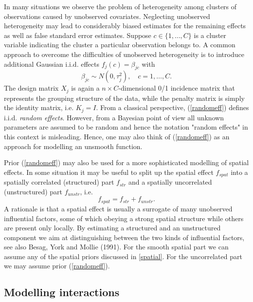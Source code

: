 \documentclass[11pt,a4paper,twoside]{bayesxarticle}
\begin{document}
In many situations we observe the problem of heterogeneity among
clusters of observations caused by unobserved covariates. Neglecting
unobserved heterogeneity may lead to considerably biased estimates
for the remaining effects as well as false standard error estimates.
Suppose $c \in \{1,\dots,C\}$ is a cluster variable indicating the
cluster a particular observation belongs to. A common approach to
overcome the difficulties of unobserved heterogeneity is to
introduce additional Gaussian i.i.d. effects $f_j(c) = \beta_{jc}$
with
\begin{equation}
\label{randomeff} \beta_{jc} \sim N(0,\tau_j^2), \quad
c=1,\dots,C.
\end{equation}
The design matrix $X_j$ is again a $n \times C$-dimensional 0/1
incidence matrix that represents the grouping structure of the data,
while the penalty matrix is simply the identity matrix, i.e.
$K_j=I$. From a classical perspective, (\ref{randomeff}) defines
i.i.d. {\em random effects}. However, from a Bayesian point of view
all unknown parameters are assumed to be random and hence the
notation "random effects" in this context is misleading. Hence, one
may also think of (\ref{randomeff}) as an approach for modelling an
unsmooth function.

Prior (\ref{randomeff}) may also be used for a more sophisticated
modelling of spatial effects. In some situation it may be useful to
split up the spatial effect $f_{spat}$ into a spatially correlated
(structured) part $f_{str}$ and a spatially uncorrelated
(unstructured) part $f_{unstr}$, i.e.
$$
f_{spat} = f_{str}+f_{unstr}.
$$
A rationale is that a spatial effect is usually a surrogate of many
unobserved influential factors, some of which obeying a strong
spatial structure while others are present only locally. By
estimating a structured and an unstructured component we aim at
distinguishing between the two kinds of influential factors, see
also Besag, York and Mollie (1991). For the smooth spatial part we
can assume any of the spatial priors discussed in \autoref{spatial}.
For the uncorrelated part we may assume prior (\ref{randomeff}).

\subsection{Modelling interactions}
\label{interactions}
\end{document}
